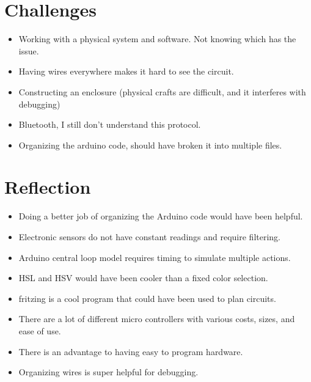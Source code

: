 \documentclass{article}
\begin{document}
	
	
	\section{Challenges}
	
	\begin{itemize}
		\item Working with a physical system and software. Not knowing which has the issue.
		\item Having wires everywhere makes it hard to see the circuit.
		\item Constructing an enclosure (physical crafts are difficult, and it interferes with debugging)
		\item Bluetooth, I still don't understand this protocol.
		\item Organizing the arduino code, should have broken it into multiple files.
	\end{itemize}
	
	\section{Reflection}
	
	\begin{itemize}
		\item Doing a better job of organizing the Arduino code would have been helpful.
		\item Electronic sensors do not have constant readings and require filtering.
		\item Arduino central loop model requires timing to simulate multiple actions.
		\item HSL and HSV would have been cooler than a fixed color selection.
		\item fritzing is a cool program that could have been used to plan circuits.
		\item There are a lot of different micro controllers with various costs, sizes, and ease of use.
		\item There is an advantage to having easy to program hardware.
		\item Organizing wires is super helpful for debugging.
	\end{itemize}
	
\end{document}

